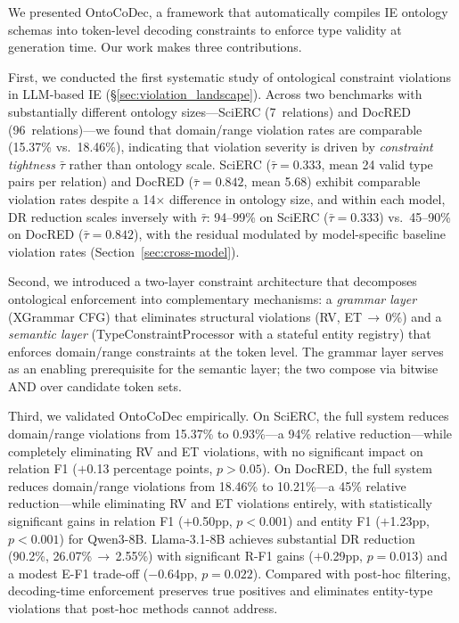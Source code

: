 
We presented OntoCoDec, a framework that automatically compiles IE ontology schemas into token-level decoding constraints to enforce type validity at generation time.
Our work makes three contributions.

First, we conducted the first systematic study of ontological constraint violations in LLM-based IE (\S\ref{sec:violation_landscape}).
Across two benchmarks with substantially different ontology sizes---SciERC (7~relations) and DocRED (96~relations)---we found that domain/range violation rates are comparable (15.37\% vs.\ 18.46\%), %
indicating that violation severity is driven by \emph{constraint tightness} $\bar{\tau}$ rather than ontology scale.
SciERC ($\bar{\tau}{=}0.333$, mean 24 valid type pairs per relation) and DocRED ($\bar{\tau}{=}0.842$, mean 5.68) exhibit comparable violation rates despite a 14$\times$ difference in ontology size, and within each model, DR reduction scales inversely with $\bar{\tau}$: 94--99\% on SciERC ($\bar{\tau}{=}0.333$) vs.\ 45--90\% on DocRED ($\bar{\tau}{=}0.842$), with the residual modulated by model-specific baseline violation rates (Section~\ref{sec:cross-model}).

Second, we introduced a two-layer constraint architecture that decomposes ontological enforcement into complementary mechanisms:
a \emph{grammar layer} (XGrammar CFG) that eliminates structural violations (RV, ET\,$\to$\,0\%) and a \emph{semantic layer} (TypeConstraintProcessor with a stateful entity registry) that enforces domain/range constraints at the token level. %
The grammar layer serves as an enabling prerequisite for the semantic layer; the two compose via bitwise AND over candidate token sets.

Third, we validated OntoCoDec empirically.
On SciERC, the full system reduces domain/range violations from 15.37\% to 0.93\%---a 94\% relative reduction---while completely eliminating RV and ET violations, with no significant impact on relation F1 ($+$0.13 percentage points, $p > 0.05$). %
On DocRED, the full system reduces domain/range violations from 18.46\% to 10.21\%---a 45\% relative reduction---while eliminating RV and ET violations entirely, with statistically significant gains in relation F1 ($+$0.50pp, $p{<}0.001$) and entity F1 ($+$1.23pp, $p{<}0.001$) for Qwen3-8B. Llama-3.1-8B achieves substantial DR reduction (90.2\%, 26.07\%\,$\to$\,2.55\%) with significant R-F1 gains ($+$0.29pp, $p{=}0.013$) and a modest E-F1 trade-off ($-$0.64pp, $p{=}0.022$). %
Compared with post-hoc filtering, decoding-time enforcement preserves true positives and eliminates entity-type violations that post-hoc methods cannot address.

